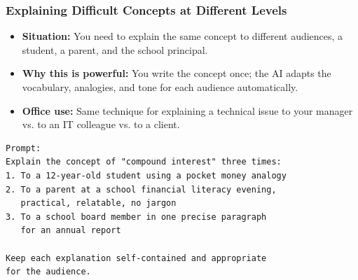 \begin{frame}[fragile]\frametitle{Explaining Difficult Concepts at Different Levels}

    \begin{itemize}
        \item \textbf{Situation:} You need to explain the same concept to different audiences, a student, a parent, and the school principal.
        \item \textbf{Why this is powerful:} You write the concept once; the AI adapts the vocabulary, analogies, and tone for each audience automatically.
        \item \textbf{Office use:} Same technique for explaining a technical issue to your manager vs. to an IT colleague vs. to a client.
    \end{itemize}

\begin{lstlisting}[language=HTML]
Prompt:
Explain the concept of "compound interest" three times:
1. To a 12-year-old student using a pocket money analogy
2. To a parent at a school financial literacy evening, 
   practical, relatable, no jargon
3. To a school board member in one precise paragraph 
   for an annual report

Keep each explanation self-contained and appropriate 
for the audience.
\end{lstlisting}


\end{frame}

